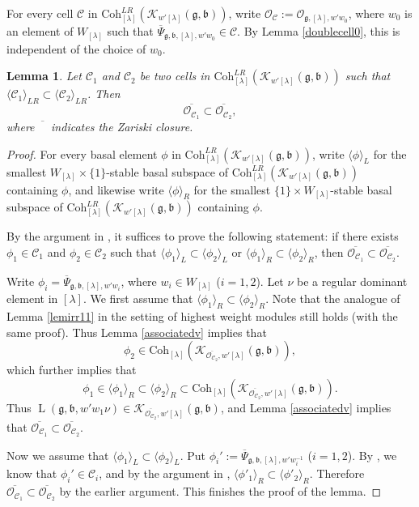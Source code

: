 \documentclass[12pt,a4paper]{amsart}
\newcommand{\CC}{{\mathcal {C}}}
\newcommand{\CK}{{\mathcal {K}}}
\newcommand{\CO}{{\mathcal {O}}}
\newcommand{\oL}{\operatorname{L}}
\newcommand{\g}{\mathfrak g}
\renewcommand{\b}{\mathfrak b}
\newcommand{\la}{\langle}
\newcommand{\ra}{\rangle}
\numberwithin{equation}{section}
\newtheorem{lem}[thm]{Lemma}
\theoremstyle{remark}
\def\Coh{\mathrm{Coh}}
\newcommand{\Lam}{{[\lambda]}}
\begin{document}
For every cell $\CC$ in $\Coh^{LR}_{\Lam}( \CK_{ w'\Lam}(\g,\b))$, write
$\CO_\CC:= \CO_{\g, \Lam, w' w_0}$, where $w_0$ is an element of $W_\Lam$ such that    $\overline \Psi_{\g,\b, \Lam, w'w_0}\in \CC$. By Lemma \ref{doublecell0}, this is independent of the choice of $w_0$.



\begin{lem}\label{lemlr0}
Let $\CC_1$ and $\CC_2$ be two cells in  $\Coh^{LR}_{\Lam}( \CK_{ w'\Lam}(\g,\b))$ such that  $\la \CC_1\ra_{LR}\subset \la \CC_2\ra_{LR}$. Then
  \[
    \overline{\CO_{\CC_1}}\subset   \overline{\CO_{\CC_2}},
  \]
  where $\overline{\phantom A}$ indicates the Zariski closure. \end{lem}
  \begin{proof}
  For every basal element $\phi$ in  $\Coh^{LR}_{\Lam}( \CK_{ w'\Lam}(\g,\b))$, write $\la \phi\ra_L$ for the smallest $W_\Lam\times \{1\}$-stable basal subspace of $\Coh^{LR}_{\Lam}( \CK_{ w'\Lam}(\g,\b))$ containing $\phi$, and likewise write $\la \phi\ra_R$ for the smallest $\{1\}\times W_\Lam$-stable basal subspace of $\Coh^{LR}_{\Lam}( \CK_{ w'\Lam}(\g,\b))$ containing $\phi$.

  By the argument in \cite[Section 3]{BVUni}, it suffices to prove the following statement:
   if there exists $\phi_1\in \CC_1$ and $\phi_2\in \CC_2$ such that $\la \phi_1\ra_L\subset \la \phi_2\ra_L$ or $\la \phi_1\ra_R\subset \la \phi_2\ra_R$, then $ \overline{\CO_{\CC_1}}\subset   \overline{\CO_{\CC_2}}$.

 Write $\phi_i= \overline \Psi_{\g,\b, \Lam, w'w_i}$, where $w_i\in W_\Lam$ ($i=1,2$). Let $\nu$ be a regular dominant element in $\Lam$.
 We first assume that  $\la \phi_1\ra_R\subset \la \phi_2\ra_R$. Note that the analogue of Lemma \ref{lemirr11} in the setting of highest weight modules still holds (with the same proof). Thus
Lemma \ref{associatedv} implies that
\[
  \phi_2\in  \Coh_{\Lam}( \CK_{\overline{\CO_{\CC_2}},  w'\Lam}(\g,\b)),
\]
which further implies that
\[
 \phi_1\in  \la \phi_1\ra_R\subset \la \phi_2\ra_R\subset  \Coh_{\Lam}( \CK_{\overline{\CO_{\CC_2}},  w'\Lam}(\g,\b)).
\]
Thus $\oL(\g,\b, w'w_1\nu)\in \CK_{\overline{\CO_{\CC_2}},  w'\Lam}(\g,\b)$, and Lemma  \ref{associatedv} implies that $ \overline{\CO_{\CC_1}}\subset   \overline{\CO_{\CC_2}}$.

Now we assume that $\la \phi_1\ra_L\subset \la \phi_2\ra_L$. Put
$\phi_i':= \overline \Psi_{\g,\b, \Lam, w'w_i^{-1}}$ ($i=1,2$). By \cite[Lemma 5.2]{Lu}, we know that $\phi_i'\in \CC_i$, and by the argument in \cite[Section 3]{BVUni},
$\la \phi'_1\ra_R\subset \la \phi'_2\ra_R$. Therefore  $ \overline{\CO_{\CC_1}}\subset   \overline{\CO_{\CC_2}}$ by the earlier argument. This finishes the proof of the lemma.
  \end{proof}
\end{document}
